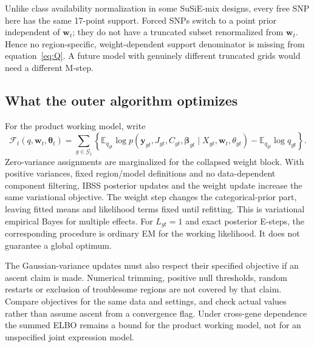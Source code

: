 \documentclass[11pt]{article}
\newcommand{\E}{\mathbb E}
\begin{document}
Unlike class availability normalization in some SuSiE-mix designs, every
free SNP here has the same 17-point support. Forced SNPs switch to a
point prior independent of $\mathbf w_t$; they do not have a truncated
subset renormalized from $\mathbf w_t$. Hence no region-specific,
weight-dependent support denominator is missing from equation~\eqref{eq:Q}.
A future model with genuinely different truncated grids would need a
different M-step.

\subsection{What the outer algorithm optimizes}
For the product working model, write
\begin{equation}
 \mathcal F_t(q,\mathbf w_t,\boldsymbol\theta_t)
 =\sum_{g\in\mathcal G_t}
   \left\{\E_{q_{gt}}\log p(\mathbf y_{gt},J_{gt},C_{gt},
           \boldsymbol\beta_{gt}\mid X_{gt},\mathbf w_t,\theta_{gt})
                 -\E_{q_{gt}}\log q_{gt}\right\}.
 \label{eq:tissue-elbo}
\end{equation}
Zero-variance assignments are marginalized for the collapsed weight block.
With positive variances, fixed region/model definitions and no
data-dependent component filtering, IBSS posterior updates and the
weight update increase the same variational objective. The weight step
changes the categorical-prior part, leaving fitted means and likelihood
terms fixed until refitting. This is variational empirical Bayes for
multiple effects. For $L_{gt}=1$ and exact posterior E-steps, the
corresponding procedure is ordinary EM for the working likelihood.
It does not guarantee a global optimum.

The Gaussian-variance updates must also respect their specified objective
if an ascent claim is made. Numerical trimming, positive null thresholds,
random restarts or exclusion of troublesome regions are not covered by
that claim. Compare objectives for the same data and settings, and check
actual values rather than assume ascent from a convergence flag.
Under cross-gene dependence the summed ELBO remains a bound for the
product working model, not for an unspecified joint expression model.
\end{document}
